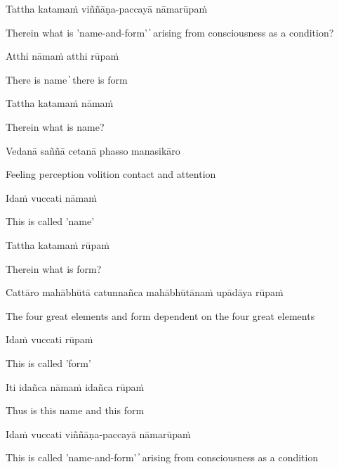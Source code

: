 Tattha katamaṁ viññāṇa-paccayā nāmarūpaṁ

\begin{cprenglish}
  Therein what is 'name-and-form'  ̓  arising from consciousness as a condition?
\end{cprenglish}

Atthi nāmaṁ atthi rūpaṁ

\begin{cprenglish}
  There is name  ̓  there is form
\end{cprenglish}

Tattha katamaṁ nāmaṁ

\begin{cprenglish}
  Therein what is name?
\end{cprenglish}

Vedanā saññā cetanā phasso manasikāro

\begin{cprenglish}
  Feeling perception volition contact and attention
\end{cprenglish}

Idaṁ vuccati nāmaṁ

\begin{cprenglish}
  This is called 'name'
\end{cprenglish}

Tattha katamaṁ rūpaṁ

\begin{cprenglish}
  Therein what is form?
\end{cprenglish}

Cattāro mahābhūtā catunnañca mahābhūtānaṁ upādāya rūpaṁ

\begin{cprenglish}
  The four great elements and form dependent on the four great elements
\end{cprenglish}

Idaṁ vuccati rūpaṁ

\begin{cprenglish}
  This is called 'form'
\end{cprenglish}

Iti idañca nāmaṁ idañca rūpaṁ

\begin{cprenglish}
  Thus is this name and this form
\end{cprenglish}

Idaṁ vuccati viññāṇa-paccayā nāmarūpaṁ

\begin{cprenglish}
  This is called 'name-and-form'  ̓  arising from consciousness as a condition
\end{cprenglish}

